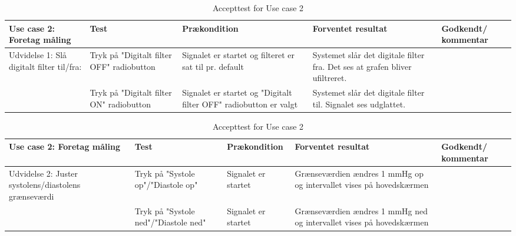 \begin{table}[H]
\caption{Accepttest for Use case 2}\label{tab:tabel11}
\begin{tabular}{|>{\raggedright\arraybackslash}p{2.5cm}| >{\raggedright\arraybackslash}p{2.9cm} | >{\raggedright\arraybackslash}p{2.9cm} | >{\raggedright\arraybackslash}p{2.9cm} | >{\raggedright\arraybackslash}p{2.8cm} |}
   \hline
   \textbf{Use case 2: Foretag måling} &\textbf{Test}& \textbf{Prækondition} & \textbf{Forventet resultat} & \textbf{Godkendt/ kommentar}\\ \hline
   Udvidelse 1: Slå digitalt filter til/fra:& Tryk på "Digitalt filter OFF" radiobutton & Signalet er startet og filteret er sat til pr. default & Systemet slår det digitale filter fra. Det ses at grafen bliver ufiltreret. &\\\hline
   &Tryk på "Digitalt filter ON" radiobutton & Signalet er startet og "Digitalt filter OFF" radiobutton er valgt & Systemet slår det digitale filter til. Signalet ses udglattet. &\\\hline
\end{tabular}
\end{table}

\begin{table}[H]
\caption{Accepttest for Use case 2}\label{tab:tabel12}
\begin{tabular}{|>{\raggedright\arraybackslash}p{2.5cm}| >{\raggedright\arraybackslash}p{2.9cm} | >{\raggedright\arraybackslash}p{2.9cm} | >{\raggedright\arraybackslash}p{2.9cm} | >{\raggedright\arraybackslash}p{2.8cm} |}
   \hline
   \textbf{Use case 2: Foretag måling } &\textbf{Test}& \textbf{Prækondition} & \textbf{Forventet resultat} & \textbf{Godkendt/ kommentar}\\ \hline
   Udvidelse 2: Juster systolens/diastolens grænseværdi& Tryk på "Systole op"/"Diastole op"& Signalet er startet & Grænseværdien ændres 1 mmHg op og intervallet vises på hovedskærmen &\\\hline
   &Tryk på "Systole ned"/"Diastole ned" & Signalet er startet & Grænseværdien ændres 1 mmHg ned og intervallet vises på hovedskærmen & \\\hline
\end{tabular}
\end{table}


